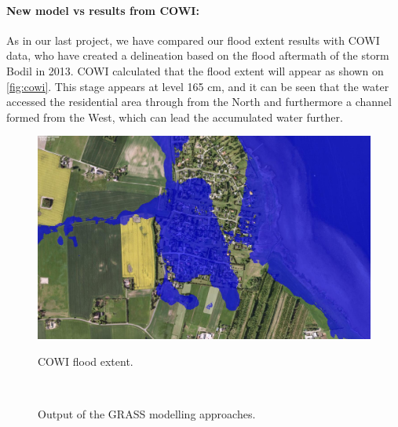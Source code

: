 \paragraph{New model vs results from COWI:} As in our last project, we have compared our flood extent results with COWI data, who have created a delineation based on the flood aftermath of the storm Bodil in 2013. COWI calculated that the flood extent will appear as shown on \autoref{fig:cowi}. This stage appears at level 165 cm, and it can be seen that the water accessed the residential area through from the North and furthermore a channel formed from the West, which can lead the accumulated water further.

\begin{figure}[h!]
\centering
	{\includegraphics[width=\linewidth]{gfx/Analysis_OldWork/COWI.jpg}}
\caption{COWI flood extent.}
\label{fig:cowi}
\end{figure}

\begin{figure}[h!]
  \myfloatalign
   \quad
   \\
  \caption{Output of the GRASS modelling approaches.}
  \label{fig:cdandspatialflood}
\end{figure}

